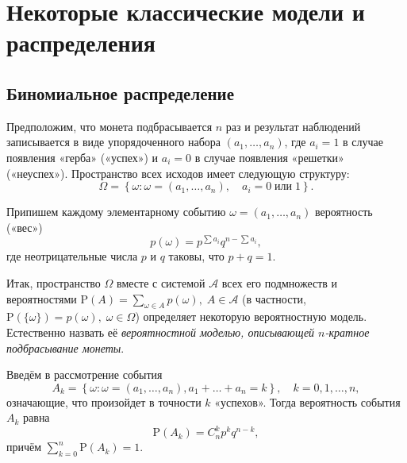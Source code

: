 \documentclass[11pt,a4paper]{article}
\begin{document}
    \hypertarget{ux43dux435ux43aux43eux442ux43eux440ux44bux435-ux43aux43bux430ux441ux441ux438ux447ux435ux441ux43aux438ux435-ux43cux43eux434ux435ux43bux438-ux438-ux440ux430ux441ux43fux440ux435ux434ux435ux43bux435ux43dux438ux44f}{%
\section{Некоторые классические модели и
распределения}\label{ux43dux435ux43aux43eux442ux43eux440ux44bux435-ux43aux43bux430ux441ux441ux438ux447ux435ux441ux43aux438ux435-ux43cux43eux434ux435ux43bux438-ux438-ux440ux430ux441ux43fux440ux435ux434ux435ux43bux435ux43dux438ux44f}}

    \hypertarget{ux431ux438ux43dux43eux43cux438ux430ux43bux44cux43dux43eux435-ux440ux430ux441ux43fux440ux435ux434ux435ux43bux435ux43dux438ux435}{%
\subsection{Биномиальное
распределение}\label{ux431ux438ux43dux43eux43cux438ux430ux43bux44cux43dux43eux435-ux440ux430ux441ux43fux440ux435ux434ux435ux43bux435ux43dux438ux435}}

Предположим, что монета подбрасывается \(n\) раз и результат наблюдений
записывается в виде упорядоченного набора \((a_1, \ldots, a_n)\), где
\(a_i = 1\) в случае появления «герба» («успех») и \(a_i = 0\) в случае
появления «решетки» («неуспех»). Пространство всех исходов имеет
следующую структуру:
\[ \Omega= \left\{ \omega: \omega = (a_1, \ldots, a_n), \quad a_i = 0 \; \mathrm{или} \; 1 \right\}. \]

Припишем каждому элементарному событию \(\omega = (a_1, \ldots, a_n)\)
вероятность («вес») \[ p(\omega) = p^{\sum a_i} q^{n-\sum a_i}, \] где
неотрицательные числа \(p\) и \(q\) таковы, что \(p + q = 1\).

Итак, пространство \(\Omega\) вместе с системой \(\mathcal{A}\) всех его
подмножеств и вероятностями
\(\mathrm{P}(A) = \sum\limits_{\omega \in A}p(\omega), \; A \in \mathcal{A}\)
(в частности,
\(\mathrm{P}(\{\omega\}) = p(\omega), \; \omega \in \Omega\)) определяет
некоторую вероятностную модель. Естественно назвать её
\emph{вероятностной моделью, описывающей \(n\)-кратное подбрасывание
монеты}.

Введём в рассмотрение события \[ 
    A_k = \left\{\omega: \omega=(a_1, \ldots, a_n), a_1 + \ldots + a_n = k\right\}, \quad k = 0, 1, \ldots, n,
\] означающие, что произойдет в точности \(k\) «успехов». Тогда
вероятность события \(A_k\) равна
\[ \mathrm{P}(A_k) = C_n^k p^k q^{n-k}, \] причём
\(\sum\limits_{k=0}^n \mathrm{P}(A_k) = 1\).
\end{document}
